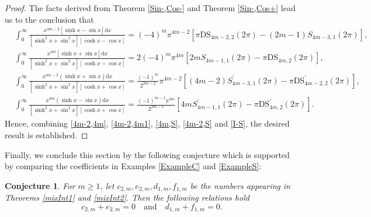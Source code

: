 \documentclass[11pt]{article}
\theoremstyle{plain}
\newtheorem{con}[thm]{Conjecture}
\theoremstyle{definition}
\begin{document}
\begin{proof}
	The facts derived from Theorem \ref{Sin-,Cos-} and Theorem \ref{Sin-,Cos+} lead us to the conclusion that
	\begin{align} \label{I-S}
		&\int_0^{\infty}{\frac{x^{4m-2}\left[ \sinh x-\sin x \right] \mathrm{d}x}{\left[ \sinh ^2x+\sin ^2x \right] \left[ \cosh x-\cos x \right]}}=\left( -4 \right) ^m\pi ^{4m-2}\left[ \pi \mathrm{DS}_{4m-2,2}\left( 2\pi \right) -\left( 2m-1 \right) S_{4m-3,1}\left( 2\pi \right) \right] ,
		\nonumber\\
		&\int_0^{\infty}{\frac{x^{4m}\left[ \sinh x+\sin x \right] \mathrm{d}x}{\left[ \sinh ^2x+\sin ^2x \right] \left[ \cosh x-\cos x \right]}}=2\left( -4 \right) ^m\pi ^{4m}\left[ 2mS_{4m-1,1}\left( 2\pi \right) -\pi \mathrm{DS}_{4m,2}\left( 2\pi \right) \right] ,
		\nonumber\\
		&\int_0^{\infty}{\frac{x^{4m-2}\left( \sinh x+\sin x \right) \mathrm{d}x}{\left[ \sinh ^2x+\sin ^2x \right] \left[ \cosh x+\cos x \right]}}=\frac{\left( -1 \right) ^m}{2^{2m-2}}\pi ^{4m-2}\left[ \left( 4m-2 \right) S_{4m-3,1}^{\prime}\left( 2\pi \right) -\pi \mathrm{DS}_{4m-2,2}^{\prime}\left( 2\pi \right) \right] ,
		\nonumber\\
		&\int_0^{\infty}{\frac{x^{4m}\left( \sinh x-\sin x \right) \mathrm{d}x}{\left[ \sinh ^2x+\sin ^2x \right] \left[ \cosh x+\cos x \right]}}=\frac{\left( -1 \right) ^{m-1}\pi ^{4m}}{2^{2m-1}}\left[ 4mS_{4m-1,1}^{\prime}\left( 2\pi \right) -\pi \mathrm{DS}_{4m,2}^{\prime}\left( 2\pi \right) \right] .
	\end{align}
	Hence, combining
	\eqref{4m-2,4m}, \eqref{4m-2,4m1}, \eqref{4m,S}, \eqref{4m-2,S} and \eqref{I-S}, the desired result is established.
	\end{proof}

Finally, we conclude this section by the following conjecture which is supported by
comparing the coefficients in Examples \ref{ExampleC} and \ref{ExampleS}:
\begin{con} For $m\ge 1$, let $c_{2,m},e_{2,m},d_{1,m},f_{1,m}$  be the numbers appearing in
	Theorems \ref{mixInt1} and \ref{mixInt2}.	 Then the following relations hold
$$
c_{2,m}+e_{2,m}=0\quad \text{and}\quad d_{1,m}+f_{1,m}=0.
$$
\end{con}

\iffalse
\end{document}
